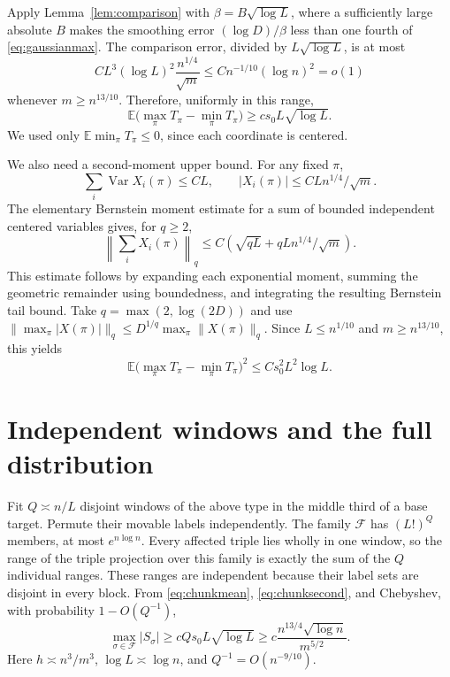 \documentclass[11pt]{article}
\newcommand{\E}{\mathbb E}
\newcommand{\Var}{\operatorname{Var}}
\begin{document}
Apply Lemma~\ref{lem:comparison} with
$\beta=B\sqrt{\log L}$, where a sufficiently large absolute $B$ makes
the smoothing error $(\log D)/\beta$ less than one fourth of
\eqref{eq:gaussianmax}. The comparison error, divided by
$L\sqrt{\log L}$, is at most
\[
 C L^3(\log L)^2\frac{n^{1/4}}{\sqrt m}
 \leq C n^{-1/10}(\log n)^2=o(1)
\]
whenever $m\geq n^{13/10}$. Therefore, uniformly in this range,
\begin{equation}\label{eq:chunkmean}
 \E\bigl(\max_\pi T_\pi-\min_\pi T_\pi\bigr)
 \geq c s_0L\sqrt{\log L}.
\end{equation}
We used only $\E\min_\pi T_\pi\leq0$, since each coordinate is centered.

We also need a second-moment upper bound. For any fixed $\pi$,
\[
 \sum_i\Var X_i(\pi)\leq CL,\qquad
 |X_i(\pi)|\leq C L n^{1/4}/\sqrt m.
\]
The elementary Bernstein moment estimate for a sum of bounded independent
centered variables gives, for $q\geq2$,
\[
 \left\|\sum_iX_i(\pi)\right\|_q
 \leq C\left(\sqrt{qL}+qL n^{1/4}/\sqrt m\right).
\]
This estimate follows by expanding each exponential moment, summing the
geometric remainder using boundedness, and integrating the resulting
Bernstein tail bound. Take $q=\max(2,\log(2D))$ and use
$\|\max_\pi|X(\pi)|\|_q\leq D^{1/q}\max_\pi\|X(\pi)\|_q$.
Since $L\leq n^{1/10}$ and $m\geq n^{13/10}$, this yields
\begin{equation}\label{eq:chunksecond}
 \E\bigl(\max_\pi T_\pi-\min_\pi T_\pi\bigr)^2
 \leq C s_0^2L^2\log L.
\end{equation}

\section{Independent windows and the full distribution}
Fit $Q\asymp n/L$ disjoint windows of the above type in the middle third
of a base target. Permute their movable labels independently. The family
$\mathcal F$ has $(L!)^Q$ members, at most $e^{n\log n}$.
Every affected triple lies wholly in one window, so the range of the
triple projection over this family is exactly the sum of the $Q$ individual
ranges. These ranges are independent because their label sets are disjoint
in every block. From \eqref{eq:chunkmean}, \eqref{eq:chunksecond}, and
Chebyshev, with probability $1-O(Q^{-1})$,
\[
 \max_{\sigma\in\mathcal F}|S_\sigma|
 \geq c Qs_0L\sqrt{\log L}
 \geq c\frac{n^{13/4}\sqrt{\log n}}{m^{5/2}}.
\]
Here $h\asymp n^3/m^3$, $\log L\asymp\log n$, and
$Q^{-1}=O(n^{-9/10})$.
\end{document}
